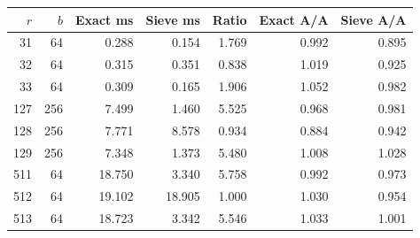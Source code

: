 \begin{tabular}{@{}rrrrrrr@{}}
\toprule
$r$ & $b$ & Exact ms & Sieve ms & Ratio & Exact A/A & Sieve A/A \\
\midrule
31 & 64 & 0.288 & 0.154 & 1.769 & 0.992 & 0.895 \\
32 & 64 & 0.315 & 0.351 & 0.838 & 1.019 & 0.925 \\
33 & 64 & 0.309 & 0.165 & 1.906 & 1.052 & 0.982 \\
127 & 256 & 7.499 & 1.460 & 5.525 & 0.968 & 0.981 \\
128 & 256 & 7.771 & 8.578 & 0.934 & 0.884 & 0.942 \\
129 & 256 & 7.348 & 1.373 & 5.480 & 1.008 & 1.028 \\
511 & 64 & 18.750 & 3.340 & 5.758 & 0.992 & 0.973 \\
512 & 64 & 19.102 & 18.905 & 1.000 & 1.030 & 0.954 \\
513 & 64 & 18.723 & 3.342 & 5.546 & 1.033 & 1.001 \\
\bottomrule
\end{tabular}

